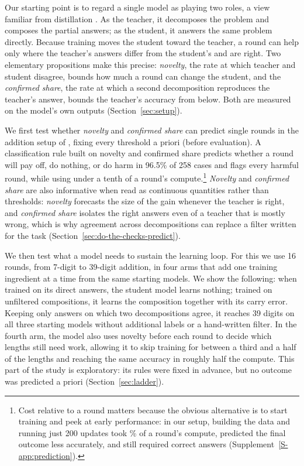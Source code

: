 Our starting point is to regard a single model as playing two roles, a view
familiar from distillation \citep{lopezpaz2016unifying, zhang2026basersi}. As
the teacher, it decomposes the problem and composes the partial answers; as the
student, it answers the same problem directly. Because training moves the
student toward the teacher, a round can help only where the teacher's answers
differ from the student's and are right. Two elementary propositions make this
precise: \emph{novelty}, the rate at which teacher and student disagree, bounds
how much a round can change the student, and the \emph{confirmed share}, the
rate at which a second decomposition reproduces the teacher's answer, bounds
the teacher's accuracy from below. Both are measured on the model's own outputs
(Section~\ref{sec:setup}).

We first test whether \emph{novelty} and \emph{confirmed share} can predict single rounds in the
addition setup of \citet{shin2026compositional}, fixing every threshold
a priori (before evaluation). A classification rule built on novelty and confirmed share predicts whether a round will pay off,
do nothing, or do harm in 96.5\% of 258 cases and flags every harmful round, while
using under a tenth of a round's compute.\footnote{Cost relative to a round
matters because the obvious alternative is to start training and peek at early
performance: in our setup, building the data and running just 200 updates took
\gpBaselineCostAdditionPct\% of a round's compute, predicted the final outcome less accurately, and
still required correct answers (Supplement~\ref{S-app:prediction}).} \emph{Novelty} and \emph{confirmed share}
are also informative when read as continuous quantities rather than
thresholds: \emph{novelty} forecasts the size of the gain whenever the
teacher is right, and \emph{confirmed share} isolates the right answers even of a teacher
that is mostly wrong, which is why agreement across decompositions can replace
a filter written for the task (Section~\ref{sec:do-the-checks-predict}).

We then test what a model needs to sustain the learning loop. For this we use 16 rounds, from
7-digit to 39-digit addition, in four arms that add one training ingredient
at a time from the same starting models. We show the following: when trained on its direct answers, the
student model learns nothing; trained on unfiltered compositions, it learns the
composition together with its carry error. Keeping only answers on which two
decompositions agree, it reaches 39 digits on all three starting models without
additional labels or a hand-written filter. In the fourth arm, the model also
uses novelty before each round to decide which lengths still need work,
allowing it to skip training for between a third and a half of the lengths and reaching the same accuracy in
roughly half the compute. This part of the study is exploratory: its rules were
fixed in advance, but no outcome was predicted a priori (Section~\ref{sec:ladder}).
